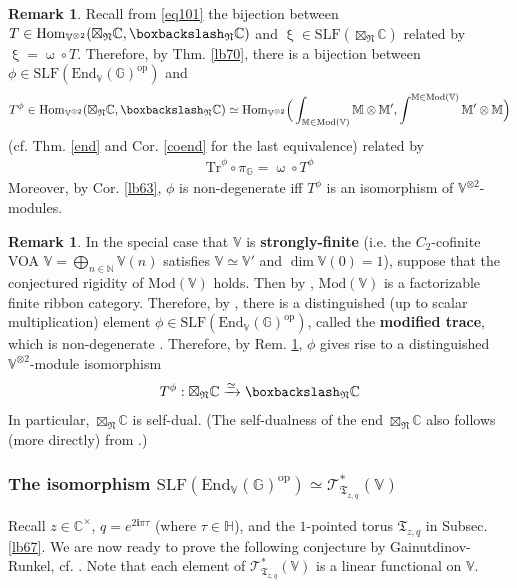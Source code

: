 \documentclass[11pt,b5paper,notitlepage]{article}
\theoremstyle{definition}
\newtheorem{rem}[df]{Remark}
\theoremstyle{plain}
\newcommand{\Tr}{\mathrm{Tr}}
\newcommand{\End}{\mathrm{End}} %
\newcommand{\Hom}{\mathrm{Hom}}
\newcommand{\opp}{\mathrm{op}}
\newcommand{\im}{\mathbf{i}}
\newcommand{\SLF}{\mathrm{SLF}}
\newcommand{\mbb}{\mathbb}
\newcommand{\Vbb}{\mathbb V}
\newcommand{\Mbb}{\mathbb M}
\newcommand{\Gbb}{\mathbb G}
\newcommand{\Cbb}{\mathbb C}
\newcommand{\Nbb}{\mathbb N}
\newcommand{\<}{\left\langle}
\renewcommand{\>}{\right\rangle}
\newcommand{\ST}{\mathscr{T}}
\newcommand{\bbs}{\boxbackslash}
\newcommand{\ft}{{\mathfrak T}}
\newcommand{\Mod}{\mathrm{Mod}}
\newcommand{\fn}{\mathfrak{N}}
\numberwithin{equation}{section}
\begin{document}
\begin{rem}\label{lb73}
Recall from \eqref{eq101} the bijection between $T\in\Hom_{\Vbb^{\otimes 2}}(\boxtimes_\fn\Cbb,\bbs_\fn\Cbb)$ and $\upxi\in\SLF(\boxtimes_\fn\Cbb)$ related by $\upxi=\upomega\circ T$. Therefore, by Thm. \ref{lb70}, there is a bijection between  $\phi\in\SLF(\End_\Vbb(\Gbb)^\opp)$ and
\begin{align*}
T^\phi\in\Hom_{\Vbb^{\otimes2}}(\boxtimes_\fn\Cbb,\bbs_\fn\Cbb)\simeq \Hom_{\Vbb^{\otimes2}}\Big(\int_{\Mbb\in\Mod(\Vbb)}\Mbb\otimes\Mbb',\int^{\Mbb\in\Mod(\Vbb)}\Mbb'\otimes\Mbb\Big)
\end{align*}
(cf. Thm. \ref{end} and Cor. \ref{coend} for the last equivalence) related by
\begin{align}
\Tr^\phi\circ\pi_\Gbb=\upomega\circ T^\phi
\end{align}
Moreover, by Cor. \ref{lb63}, $\phi$ is non-degenerate iff $T^\phi$ is an isomorphism of $\Vbb^{\otimes 2}$-modules.
\end{rem}

\begin{rem}\label{lb74}
In the special case that $\Vbb$ is \textbf{strongly-finite} (i.e. the $C_2$-cofinite VOA $\Vbb=\bigoplus_{n\in\Nbb}\Vbb(n)$ satisfies $\Vbb\simeq\Vbb'$ and $\dim\Vbb(0)=1$), suppose that the conjectured rigidity of $\Mod(\Vbb)$ holds. Then by \cite{McR21-rational}, $\Mod(\Vbb)$ is a factorizable finite ribbon category. Therefore, by \cite{GR-modified-trace}, there is a distinguished (up to scalar multiplication) element $\phi\in\SLF(\End_\Vbb(\Gbb)^\opp)$, called the \textbf{modified trace}, which is non-degenerate \cite[Prop. 4.2]{GR-modified-trace}. Therefore, by Rem. \ref{lb73}, $\phi$ gives rise to a distinguished $\Vbb^{\otimes 2}$-module isomorphism
\begin{align*}
T^\phi:\boxtimes_\fn\Cbb\xrightarrow{\simeq}\bbs_\fn\Cbb
\end{align*}
In particular, $\boxtimes_\fn\Cbb$ is self-dual. (The self-dualness of the end $\boxtimes_\fn\Cbb$ also follows (more directly) from \cite{Shi-unimodular}.)
\end{rem}




\subsubsection{The isomorphism $\SLF(\End_\Vbb(\Gbb)^\opp)\simeq\ST^*_{\ft_{z,q}}(\Vbb)$}


Recall $z\in\Cbb^\times$, $q=e^{2\im\pi\tau}$ (where $\tau\in\mbb H$), and the $1$-pointed torus $\ft_{z,q}$ in Subsec. \ref{lb67}. We are now ready to prove the following conjecture by Gainutdinov-Runkel, cf. \cite[Conjecture 5.8]{GR-Verlinde}. Note that each element of $\ST^*_{\ft_{z,q}}(\Vbb)$ is a linear functional on $\Vbb$.
\end{document}
